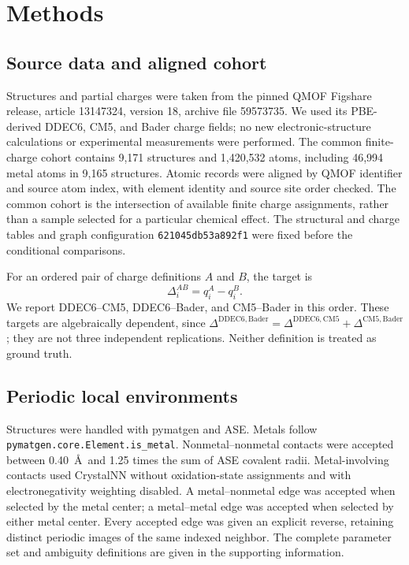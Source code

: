 \section{Methods}
\subsection{Source data and aligned cohort}
Structures and partial charges were taken from the pinned QMOF Figshare release, article 13147324, version 18, archive file 59573735.\cite{Rosen2021,Rosen2022,QMOFv18} We used its PBE-derived DDEC6, CM5, and Bader charge fields; no new electronic-structure calculations or experimental measurements were performed. The common finite-charge cohort contains 9,171 structures and 1,420,532 atoms, including 46,994 metal atoms in 9,165 structures. Atomic records were aligned by QMOF identifier and source atom index, with element identity and source site order checked. The common cohort is the intersection of available finite charge assignments, rather than a sample selected for a particular chemical effect. The structural and charge tables and graph configuration \nolinkurl{621045db53a892f1} were fixed before the conditional comparisons.

For an ordered pair of charge definitions $A$ and $B$, the target is
\begin{equation}
 \Delta_i^{AB}=q_i^A-q_i^B.
\end{equation}
We report DDEC6--CM5, DDEC6--Bader, and CM5--Bader in this order. These targets are algebraically dependent, since $\Delta^{\mathrm{DDEC6,Bader}}=\Delta^{\mathrm{DDEC6,CM5}}+\Delta^{\mathrm{CM5,Bader}}$; they are not three independent replications. Neither definition is treated as ground truth.

\subsection{Periodic local environments}
Structures were handled with pymatgen and ASE.\cite{Ong2013,Larsen2017} Metals follow \nolinkurl{pymatgen.core.Element.is_metal}. Nonmetal--nonmetal contacts were accepted between 0.40~\AA\ and 1.25 times the sum of ASE covalent radii. Metal-involving contacts used CrystalNN\cite{Zimmermann2020} without oxidation-state assignments and with electronegativity weighting disabled. A metal--nonmetal edge was accepted when selected by the metal center; a metal--metal edge was accepted when selected by either metal center. Every accepted edge was given an explicit reverse, retaining distinct periodic images of the same indexed neighbor. The complete parameter set and ambiguity definitions are given in the supporting information.

